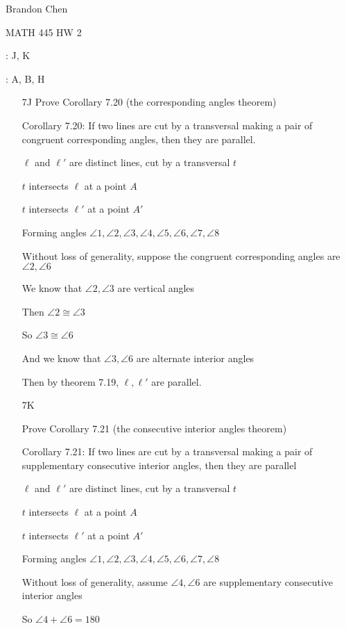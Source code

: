 \documentclass[11pt]{article}
\begin{document}
\noindent Brandon Chen

\noindent MATH 445 HW 2

: J, K

: A, B, H

\begin{itemize}

	\item[7J]
		Prove Corollary 7.20 (the corresponding angles theorem)	

		Corollary 7.20: If two lines are cut by a transversal making a pair of congruent corresponding angles, then they are parallel.

		$\ell$ and $\ell'$ are distinct lines, cut by a transversal $t$

		$t$ intersects $\ell$ at a point $A$

		$t$ intersects $\ell'$ at a point $A'$

		Forming angles $\angle 1, \angle 2, \angle 3, \angle 4, \angle 5, \angle 6, \angle 7, \angle 8$

		Without loss of generality, suppose the congruent corresponding angles are $\angle 2, \angle 6$

		We know that $\angle 2, \angle 3$ are vertical angles

		Then $\angle 2 \cong \angle 3$

		So $\angle 3 \cong \angle 6$

		And we know that $\angle 3, \angle 6$ are alternate interior angles

		Then by theorem 7.19, $\ell, \ell'$ are parallel.	

	\item[7K]

		Prove Corollary 7.21 (the consecutive interior angles theorem)

		Corollary 7.21: If two lines are cut by a transversal making a pair of supplementary consecutive interior angles, then they are parallel

		$\ell$ and $\ell'$ are distinct lines, cut by a transversal $t$

		$t$ intersects $\ell$ at a point $A$

		$t$ intersects $\ell'$ at a point $A'$

		Forming angles $\angle 1, \angle 2, \angle 3, \angle 4, \angle 5, \angle 6, \angle 7, \angle 8$

		Without loss of generality, assume $\angle 4, \angle 6$ are supplementary consecutive interior angles

		So $\angle 4 + \angle 6 = 180$


\end{itemize}
\end{document}
